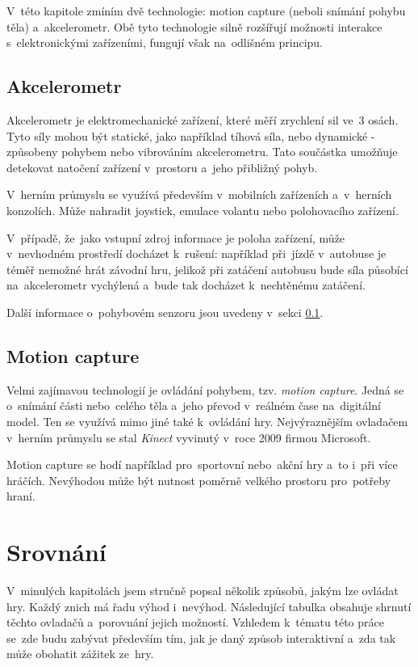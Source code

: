 \documentclass[thesis=B,czech,hidelinks]{FITthesis}[2012/06/26] %
\begin{document}
V~této kapitole zmíním dvě technologie: motion capture (neboli snímání pohybu těla) a~akcelerometr. Obě tyto technologie silně rozšířují možnosti interakce s~elektronickými zařízeními, fungují však na~odlišném principu.

\subsection{Akcelerometr}
\label{section:accelerometer}

Akcelerometr je elektromechanické zařízení, které měří zrychlení sil ve~3 osách. Tyto síly mohou být statické, jako například tíhová síla, nebo dynamické - způsobeny pohybem nebo vibrováním akcelerometru.\cite{acc} Tato součástka umožňuje detekovat natočení zařízení v~prostoru a~jeho přibližný pohyb.

V~herním průmyslu se využívá především v~mobilních zařízeních a~v~herních konzolích. Může nahradit joystick, emulace volantu nebo polohovacího zařízení. 

V~případě, že~jako vstupní zdroj informace je poloha zařízení, může v~nevhodném prostředí docházet k~rušení: například při~jízdě v~autobuse je téměř nemožné hrát závodní hru, jelikož při zatáčení autobusu bude síla působící na~akcelerometr vychýlená a~bude tak docházet k~nechtěnému zatáčení.

Další informace o~pohybovém senzoru jsou uvedeny v~sekci \ref{section:accelerometer}.

\subsection{Motion capture}
\label{section:motion_capture}

Velmi zajímavou technologií je ovládání pohybem, tzv. \textit{motion capture}. Jedná se o~snímání části nebo~celého těla a~jeho převod v~reálném čase na~digitální model. Ten se využívá mimo jiné také k~ovládání hry. Nejvýraznějším ovladačem v~herním průmyslu se stal \textit{Kinect} vyvinutý v~roce 2009 firmou Microsoft. \cite{meetthekinect}

Motion capture se hodí například pro~sportovní nebo~akční hry a~to i~při více hráčích. Nevýhodou může být nutnost poměrně velkého prostoru pro~potřeby hraní.

\section{Srovnání}

V~minulých kapitolách jsem stručně popsal několik způsobů, jakým lze ovládat hry. Každý znich má řadu výhod i~nevýhod. Následující tabulka obsahuje shrnutí těchto ovladačů a~porovnání jejich možností. Vzhledem k~tématu této práce se~zde budu zabývat především tím, jak je daný způsob interaktivní a~zda tak může obohatit zážitek ze~hry.
\end{document}
